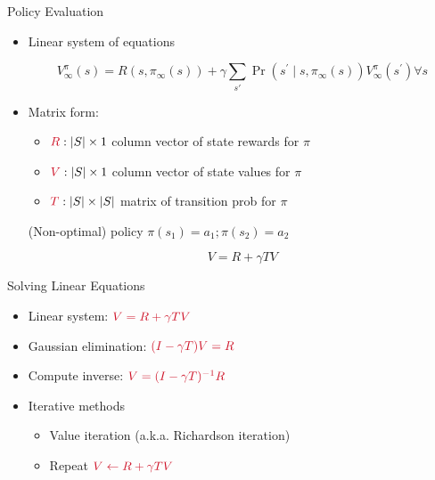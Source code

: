 \documentclass[11pt,table]{beamer}
\begin{document}
\begin{frame}{Policy Evaluation}

\begin{itemize}
\item  Linear system of equations


$$
V_{\infty}^{\pi}(s)=R\left(s, \pi_{\infty}(s)\right)+\gamma \sum_{s \prime} \operatorname{Pr}\left(s^{\prime} \mid s, \pi_{\infty}(s)\right) V_{\infty}^{\pi}\left(s^{\prime}\right) \forall s
$$

\item Matrix form:

    \begin{itemize}
        \item[] $\textcolor{red1}{R}:|S| \times 1$ column vector of state rewards for $\pi$
				\item[] $\textcolor{red1}{V}:|S| \times 1$ column vector of state values for $\pi$
				\item[] $\textcolor{red1}{T}:|S| \times|S|$ matrix of transition prob for $\pi$
    \end{itemize}

\vspace{3mm}

(Non-optimal) policy $\pi\left(s_{1}\right)=a_{1} ; \pi\left(s_{2}\right)=a_{2}$

$$
V=R+\gamma TV
$$
\end{itemize}
    
\end{frame}

\begin{frame}{Solving Linear Equations}

\begin{itemize}
    \item Linear system: $\textcolor{red1}{V=R+\gamma T V}$


\item Gaussian elimination: $\textcolor{red1}{(I-\gamma T) V=R}$

\item Compute inverse: $\textcolor{red1}{V=(I-\gamma T)^{-1} R}$

\item Iterative methods
\begin{itemize}
     
 \item Value iteration (a.k.a. Richardson iteration)
\item Repeat $\textcolor{red1}{V \leftarrow R+\gamma T V}$ 
\end{itemize}
    \end{itemize}
\end{frame}
\end{document}
